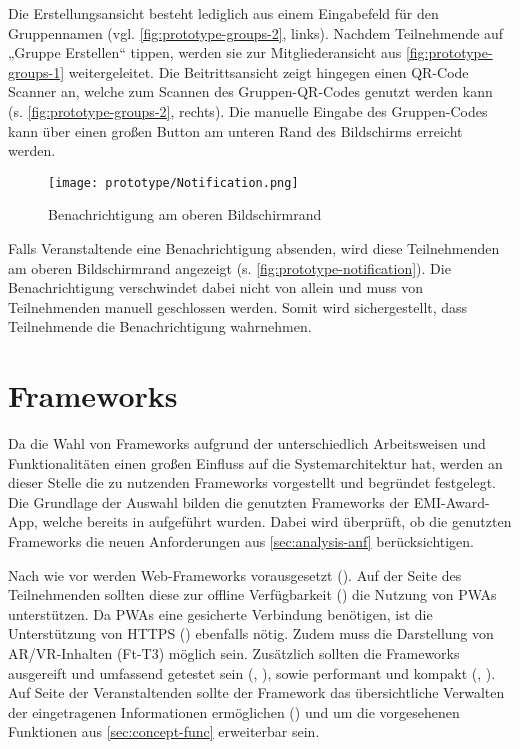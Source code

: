 Die Erstellungsansicht besteht lediglich aus einem Eingabefeld für den
Gruppennamen (vgl. \autoref{fig:prototype-groups-2}, links). Nachdem
Teilnehmende auf „Gruppe Erstellen“ tippen, werden sie zur Mitgliederansicht aus
\autoref{fig:prototype-groups-1} weitergeleitet. Die Beitrittsansicht zeigt
hingegen einen QR-Code Scanner an, welche zum Scannen des Gruppen-QR-Codes
genutzt werden kann (s. \autoref{fig:prototype-groups-2}, rechts). Die manuelle
Eingabe des Gruppen-Codes kann über einen großen Button am unteren Rand des Bildschirms
erreicht werden.

\begin{figure}[htpb]
    \centering
    \texttt{[image: prototype/Notification.png]}
    \caption{Benachrichtigung am oberen Bildschirmrand}
    \label{fig:prototype-notification}
\end{figure}

Falls Veranstaltende eine Benachrichtigung absenden, wird diese Teilnehmenden am
oberen Bildschirmrand angezeigt (s. \autoref{fig:prototype-notification}). Die
Benachrichtigung verschwindet dabei nicht von allein und muss von Teilnehmenden
manuell geschlossen werden. Somit wird sichergestellt, dass Teilnehmende die
Benachrichtigung wahrnehmen.


\section{Frameworks}

Da die Wahl von Frameworks aufgrund der unterschiedlich Arbeitsweisen und
Funktionalitäten einen großen Einfluss auf die Systemarchitektur hat, werden an
dieser Stelle die zu nutzenden Frameworks vorgestellt und begründet festgelegt.
Die Grundlage der Auswahl bilden die genutzten Frameworks der EMI-Award-App,
welche bereits in  aufgeführt wurden. Dabei wird
überprüft, ob die genutzten Frameworks die neuen Anforderungen aus
\autoref{sec:analysis-anf} berücksichtigen.

Nach wie vor werden Web-Frameworks vorausgesetzt (). Auf der Seite
des Teilnehmenden sollten diese zur offline Verfügbarkeit () die
Nutzung von \acp{PWA} unterstützen. Da \acp{PWA} eine gesicherte Verbindung
benötigen, ist die Unterstützung von HTTPS () ebenfalls nötig. Zudem
muss die Darstellung von \ac{AR}/\ac{VR}-Inhalten (Ft-T3) möglich sein. Zusätzlich sollten
die Frameworks ausgereift und umfassend getestet sein (,
), sowie performant und kompakt (, ). Auf
Seite der Veranstaltenden sollte der Framework das übersichtliche Verwalten der
eingetragenen Informationen ermöglichen () und um die vorgesehenen
Funktionen aus \autoref{sec:concept-func} erweiterbar sein.

